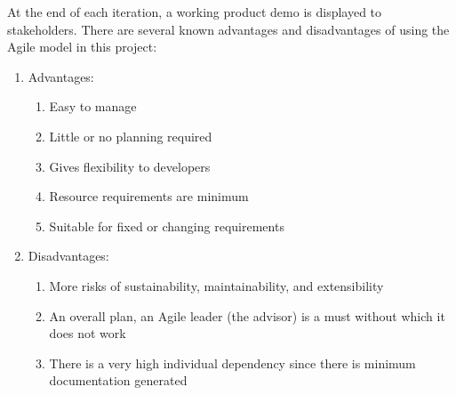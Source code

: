 At the end of each iteration, a working product demo is displayed to stakeholders. There are several known advantages and disadvantages of using the Agile model in this project:
\begin{enumerate}

  \item Advantages:
  \begin{enumerate}
    \item Easy to manage
    \item Little or no planning required
    \item Gives flexibility to developers
    \item Resource requirements are minimum
    \item Suitable for fixed or changing requirements
  \end{enumerate}

  \item Disadvantages:
  \begin{enumerate}
    \item More risks of sustainability, maintainability, and extensibility
    \item An overall plan, an Agile leader (the advisor) is a must without which it does not work
    \item There is a very high individual dependency since there is minimum documentation generated
  \end{enumerate}

\end{enumerate}
